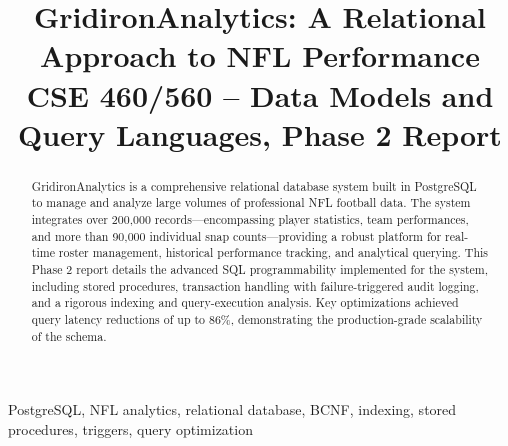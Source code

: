 \documentclass[conference]{IEEEtran}
\begin{document}
\title{GridironAnalytics: A Relational Approach to NFL Performance\\
{\footnotesize \textnormal{CSE 460/560 -- Data Models and Query Languages, Phase 2 Report}}
}

\author{
  \and
  \and
}

\maketitle

\begin{abstract}
GridironAnalytics is a comprehensive relational database system built in PostgreSQL to manage and analyze large volumes of professional NFL football data. The system integrates over 200{,}000 records—encompassing player statistics, team performances, and more than 90{,}000 individual snap counts—providing a robust platform for real-time roster management, historical performance tracking, and analytical querying. This Phase 2 report details the advanced SQL programmability implemented for the system, including stored procedures, transaction handling with failure-triggered audit logging, and a rigorous indexing and query-execution analysis. Key optimizations achieved query latency reductions of up to 86\%, demonstrating the production-grade scalability of the schema.
\end{abstract}

\begin{IEEEkeywords}
PostgreSQL, NFL analytics, relational database, BCNF, indexing, stored procedures, triggers, query optimization
\end{IEEEkeywords}

\end{document}
